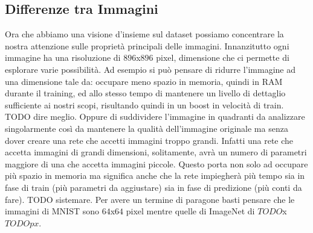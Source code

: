\subsection{Differenze tra Immagini}
Ora che abbiamo una visione d'insieme sul dataset possiamo concentrare la nostra attenzione sulle proprietà principali delle immagini.
Innanzitutto ogni immagine ha una risoluzione di $896$x$896$ pixel, dimensione che ci permette di esplorare varie possibilità.
Ad esempio si può pensare di ridurre l'immagine ad una dimensione tale da: occupare meno spazio in memoria, quindi in RAM durante il training, ed allo stesso tempo di mantenere un livello di dettaglio sufficiente ai nostri scopi, risultando quindi in un boost in velocità di train. TODO dire meglio.
Oppure di suddividere l'immagine in quadranti da analizzare singolarmente così da mantenere la qualità dell'immagine originale ma senza dover creare una rete che accetti immagini troppo grandi.
Infatti una rete che accetta immagini di grandi dimensioni, solitamente, avrà un numero di parametri maggiore di una che accetta immagini piccole.
Questo porta non solo ad occupare più spazio in memoria ma significa anche che la rete impiegherà più tempo sia in fase di train (più parametri da aggiustare) sia in fase di predizione (più conti da fare). TODO sistemare.
Per avere un termine di paragone basti pensare che le immagini di MNIST sono $64$x$64$ pixel mentre quelle di ImageNet di $TODO$x$TODOpx$.

